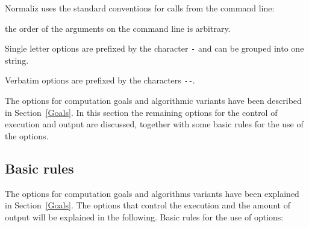 Normaliz uses the standard conventions for calls from the command line:
\begin{arab}
	\item the order of the arguments on the command line is arbitrary.
	\item Single letter options are prefixed by the character \verb|-| and can be grouped into one string.
	\item Verbatim options are prefixed by the characters \verb|--|.
\end{arab}

The options for computation goals and algorithmic variants have been described in Section~\ref{Goals}. In this section the remaining options for the control of execution and output are discussed, together with some basic rules for the use of the options.

\subsection{Basic rules}
The options for computation goals and algorithms variants have been explained in Section~\ref{Goals}. The options that control the execution and the amount of output will be explained in the following. Basic rules for the use of options:


